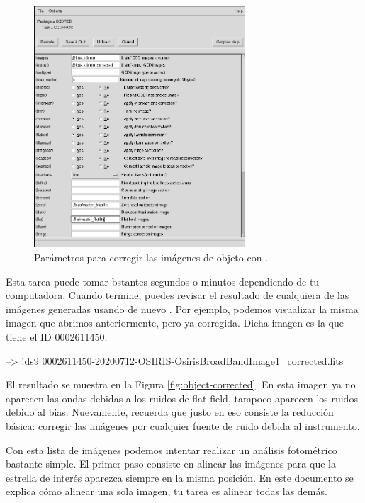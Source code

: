\begin{figure}[htb]
  \centering
	\includegraphics[width=0.7\textwidth]{figures/pyraf-object-correction.png}
	\caption{Parámetros para corregir las imágenes de objeto con .}
	\label{fig:pyraf-object-correction} 
\end{figure}

Esta tarea puede tomar bstantes segundos o minutos dependiendo de tu computadora. Cuando termine, puedes revisar el resultado de cualquiera de las imágenes generadas usando de nuevo . Por ejemplo, podemos visualizar la misma imagen que abrimos anteriormente, pero ya corregida. Dicha imagen es la que tiene el ID 0002611450.

\begin{shell}
--> !ds9 0002611450-20200712-OSIRIS-OsirisBroadBandImage1_corrected.fits
\end{shell}

El resultado se muestra en la Figura \ref{fig:object-corrected}. En esta imagen ya no aparecen las ondas debidas a los ruidos de flat field, tampoco aparecen los ruidos debido al bias. Nuevamente, recuerda que justo en eso consiste la reducción básica: corregir las imágenes por cualquier fuente de ruido debida al instrumento.

Con esta lista de imágenes podemos intentar realizar un análisis fotométrico bastante simple. El primer paso consiste en alinear las imágenes para que la estrella de interés aparezca siempre en la misma posición. En este documento se explica cómo alinear una sola imagen, tu tarea es alinear todas las demás. 


